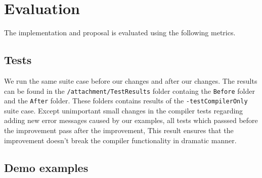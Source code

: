 \chapter{Evaluation}

The implementation and proposal is evaluated using the following metrics.

\section{Tests}

We run the same suite case before our changes and after our changes.
The results can be found in the \texttt{/attachment/TestResults} folder containg the \texttt{Before} folder and the \texttt{After} folder.
These folders contains results of the \texttt{-testCompilerOnly} suite case.
Except unimportant small changes in the compiler tests regarding adding new error messages caused by our examples, all tests which passsed before the improvement pass after the improvement,
This result ensures that the improvement doesn't break the compiler functionality in dramatic manner. 

\section{Demo examples}

